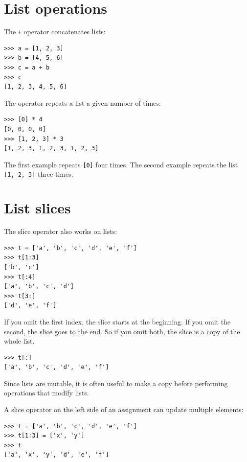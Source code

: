 \documentclass[10pt]{book}
\begin{document}
\section{List operations}

The {\tt +} operator concatenates lists:

\begin{verbatim}
>>> a = [1, 2, 3]
>>> b = [4, 5, 6]
>>> c = a + b
>>> c
[1, 2, 3, 4, 5, 6]
\end{verbatim}
%
The {\tt *} operator repeats a list a given number of times:

\begin{verbatim}
>>> [0] * 4
[0, 0, 0, 0]
>>> [1, 2, 3] * 3
[1, 2, 3, 1, 2, 3, 1, 2, 3]
\end{verbatim}
%
The first example repeats {\tt [0]} four times.  The second example
repeats the list {\tt [1, 2, 3]} three times.


\section{List slices}

The slice operator also works on lists:

\begin{verbatim}
>>> t = ['a', 'b', 'c', 'd', 'e', 'f']
>>> t[1:3]
['b', 'c']
>>> t[:4]
['a', 'b', 'c', 'd']
>>> t[3:]
['d', 'e', 'f']
\end{verbatim}
%
If you omit the first index, the slice starts at the beginning.
If you omit the second, the slice goes to the end.  So if you
omit both, the slice is a copy of the whole list.

\begin{verbatim}
>>> t[:]
['a', 'b', 'c', 'd', 'e', 'f']
\end{verbatim}
%
Since lists are mutable, it is often useful to make a copy
before performing operations that modify lists.

A slice operator on the left side of an assignment
can update multiple elements:

\begin{verbatim}
>>> t = ['a', 'b', 'c', 'd', 'e', 'f']
>>> t[1:3] = ['x', 'y']
>>> t
['a', 'x', 'y', 'd', 'e', 'f']
\end{verbatim}
%
\end{document}
